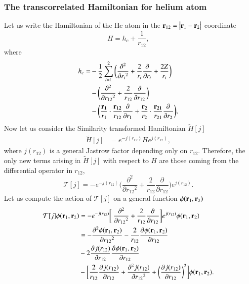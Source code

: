 \documentclass[aip,jcp,reprint,noshowkeys,superscriptaddress]{revtex4-1}
\newcommand{\deriv}[3]{\frac{\partial^{#3} #1}{\partial {#2}^{#3}}}
\newcommand{\bd}[1]{{\bf {#1}}}
\newcommand{\br}[0]{{\bf {r}}}
\begin{document}
\subsubsection{The transcorrelated Hamiltonian for helium atom}
Let us write the Hamiltonian of the He atom in the ${\bf r}_{12} = \big|{\bf r}_1 - {\bf r}_2 \big|$ coordinate 
\begin{equation}
 H  = h_c + \frac{1}{r_{12}},
\end{equation}
where 
\begin{equation}
 \begin{aligned}
 \label{def:h_c}
 h_c = &-\frac{1}{2} \sum_{i=1}^2 \bigg(\deriv{}{r_i}{2} + \frac{2}{r_i} \deriv{}{r_i}{} + \frac{2 Z}{r_i}\bigg) \\
     &-\bigg( \deriv{}{r_{12}}{2} + \frac{2}{r_{12}} \deriv{}{r_{12}}{} \bigg) \\
     &-\bigg( \frac{\bd{r_1}}{r_1} \cdot \frac{\bd{r_{12}} }{r_{12}}  \deriv{}{r_1}{} + 
                \frac{\bd{r_2}}{r_2} \cdot \frac{\bd{r_{21}} }{r_{21}}  \deriv{}{r_2}{} \bigg),
 \end{aligned}
\end{equation}
\label{sec:he_j}
Now let us consider the Similarity transformed Hamiltonian $\tilde{H}[j]$
\begin{equation}
 \label{eq:ht_0}
 \begin{aligned}
 \tilde{H}[j]&= e^{-j(r_{12})} H e^{j(r_{12})},
 \end{aligned}
\end{equation}
where $j(r_{12})$ is a general Jastrow factor depending only on $r_{12}$. 
Therefore, the only new terms arising in $\tilde{H}[j]$ with respect to $H$ are those coming from the differential operator in $r_{12}$,
\begin{equation}
 \mathcal{T}[j] =  -e^{-j(r_{12})}\bigg( \deriv{}{r_{12}}{2} + \frac{2}{r_{12}} \deriv{}{r_{12}}{} \bigg)e^{j(r_{12})}.  
\end{equation}
Let us compute the action of $\mathcal{T}[j]$ on a general function $\phi(\br{}_1,\br{}_2)$ 
\begin{equation}
 \begin{aligned}
 \mathcal{T}[j]\phi(\br{}_1,\br{}_2) & =- e^{-j(r_{12})} \bigg[ \deriv{}{r_{12}}{2} + \frac{2}{r_{12}} \deriv{}{r_{12}}{}\bigg]  e^{j(r_{12})} \phi(\br{}_1,\br{}_2) \\ 
                            &=  -\deriv{\phi(\br{}_1,\br{}_2)}{r_{12}}{2} - \frac{2}{r_{12}} \deriv{\phi(\br{}_1,\br{}_2)}{r_{12}}{} \\
  &- 2 \deriv{j(r_{12})}{r_{12}}{} \deriv{\phi(\br{}_1,\br{}_2)}{r_{12}}{} \\ 
  &- \bigg[ \frac{2}{r_{12}} \deriv{j(r_{12})}{r_{12}}{}  + \deriv{j(r_{12})}{r_{12}}{2} + \bigg( \deriv{j(r_{12})}{r_{12}}{} \bigg)^2\bigg] \phi(\br{}_1,\br{}_2). 
 \end{aligned}
\end{equation}
\end{document}
